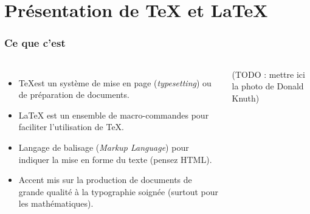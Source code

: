 \section{Présentation de {\TeX} et \LaTeX}


\begin{frame}

	\frametitle{Ce que c'est}
	
	\begin{columns}
		
			\begin{itemize}
				
				\item \TeX est un système de mise en	page (\emph{typesetting}) ou de
				préparation de documents.
				
				\item {\LaTeX} est un ensemble de macro-commandes pour faciliter l’utilisation de \TeX.
				
				\item Langage de balisage (\emph{Markup Language}) pour indiquer la	mise en forme
					du texte (pensez HTML).
					
				\item Accent mis sur la production de documents de grande qualité à la typographie
					soignée (surtout pour les mathématiques).
			\end{itemize}
		
		
			(TODO : mettre ici la photo de Donald Knuth)
	\end{columns}

\end{frame}


